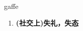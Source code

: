 
\begin{frame}
{\huge gaffe}
\begin{center}
\begin{enumerate}\Large
  \item \textbf{(社交上)失礼，失态}
\end{enumerate}
\end{center}
\end{frame}
